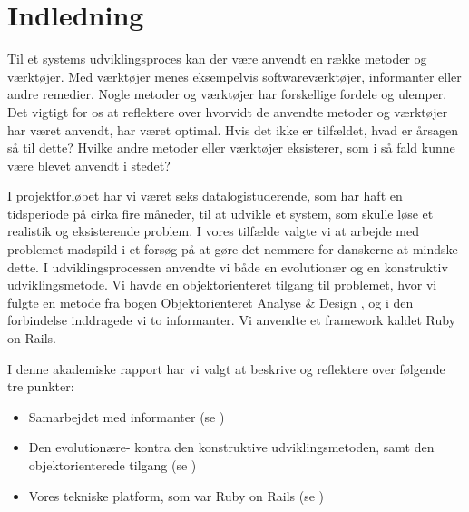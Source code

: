 \chapter{Indledning}

Til et systems udviklingsproces kan der være anvendt en række metoder og værktøjer. Med værktøjer menes eksempelvis softwareværktøjer, informanter eller andre remedier. Nogle metoder og værktøjer har forskellige fordele og ulemper. Det vigtigt for os at reflektere over hvorvidt de anvendte metoder og værktøjer har været anvendt, har været optimal. Hvis det ikke er tilfældet, hvad er årsagen så til dette? Hvilke andre metoder eller værktøjer eksisterer, som i så fald kunne være blevet anvendt i stedet?

I projektforløbet har vi været seks datalogistuderende, som har haft en tidsperiode på cirka fire måneder, til at udvikle et system, som skulle løse et realistik og eksisterende problem. I vores tilfælde valgte vi at arbejde med problemet madspild i et forsøg på at gøre det nemmere for danskerne at mindske dette. I udviklingsprocessen anvendte vi både en evolutionær og en konstruktiv udviklingsmetode. Vi havde en objektorienteret tilgang til problemet, hvor vi fulgte en metode fra bogen Objektorienteret Analyse \& Design \cite{ooad}, og i den forbindelse inddragede vi to informanter. Vi anvendte et framework kaldet Ruby on Rails. 

I denne akademiske rapport har vi valgt at beskrive og reflektere over følgende tre punkter:

\begin{itemize}[noitemsep]
  \item Samarbejdet med informanter (se )
  \item Den evolutionære- kontra den konstruktive udviklingsmetoden, samt den objektorienterede tilgang (se )
  \item Vores tekniske platform, som var Ruby on Rails (se )
\end{itemize}

